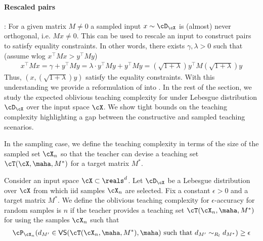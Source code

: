 \paragraph{Rescaled pairs}: For a given matrix $M \neq 0$ a sampled input $x \sim \cD_{\cX}$ is (almost) never orthogonal, i.e. $Mx \neq 0$. This can be used to rescale an input to construct pairs to satisfy equality constraints. In other words, there exists $\gamma, \lambda >0$ such that (assume wlog $x^{\top}Mx > y^{\top}My$)
\begin{align*}
    x^{\top}Mx = \gamma + y^{\top}My = \lambda\cdot y^{\top}My + y^{\top}My = (\sqrt{1 + \lambda})y^{\top}M(\sqrt{1 + \lambda})y 
\end{align*}
Thus, $(x, (\sqrt{1 + \lambda})y)$ satisfy the equality constraints. With this understanding we provide a reformulation of  into . In the rest of the section, we study the expected oblivious teaching complexity for   under Lebesgue distribution $\cD_{\cX}$ over the input space $\cX$. We show tight bounds on the teaching complexity highlighting a gap between the constructive and sampled teaching scenarios. 

In the sampling case, we define the teaching complexity in terms of the size of the sampled set $\cX_n$ so that the teacher can devise a teaching set $\cT(\cX, \maha,M^*)$ for a target matrix $M^*$.
\begin{definition}\label{defn: lebsample}
    Consider an input space $\cX \subset \reals^d$. Let $\cD_{\cX}$ be a Lebesgue distribution over $\cX$ from which iid samples $\cX_n$ are selected. Fix a constant $\epsilon > 0$ and a target matrix $M^*$. We define the oblivious teaching complexity for $\epsilon$-accuracy for random samples is $n$ if the teacher provides a teaching set $\cT(\cX_n, \maha,M^*)$ for  using the samples $\cX_n$ such that
    \begin{align*}
        \cP_{\cX_n}(d_{M'} \in \textsf{VS}(\cT(\cX_n, \maha,M^*), \maha) \textnormal{ such that } d_{M'} \sim_{R_l} d_{M^*}) \ge \epsilon
    \end{align*}
\end{definition}

